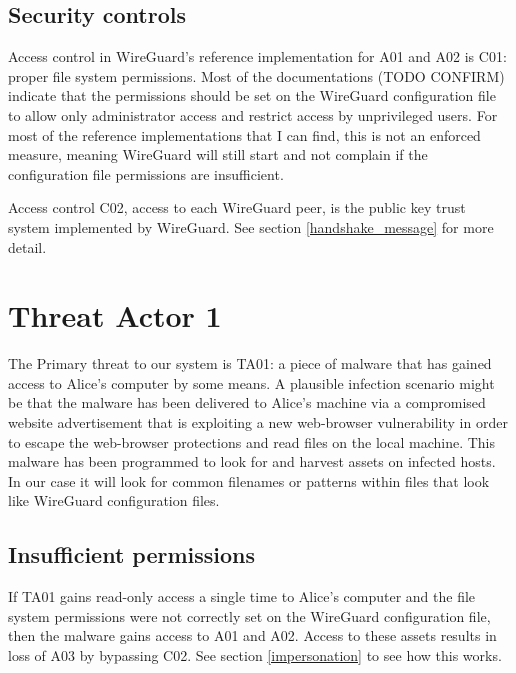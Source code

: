 \documentclass [11pt, proquest] {uwthesis}[2020/02/24]
\begin{document}
\subsection{Security controls}
Access control in WireGuard's reference implementation for A01 and A02 is C01: proper file system permissions. Most of the documentations (TODO CONFIRM) indicate that the permissions should be set on the WireGuard configuration file to allow only administrator access and restrict access by unprivileged users. For most of the reference implementations that I can find, this is not an enforced measure, meaning WireGuard will still start and not complain if the configuration file permissions are insufficient. 

Access control C02, access to each WireGuard peer, is the public key trust system implemented by WireGuard. See section \ref{handshake_message} for more detail.

\section{Threat Actor 1}
The Primary threat to our system is TA01: a piece of malware that has gained access to Alice's computer by some means. A plausible infection scenario might be that the malware has been delivered to Alice's machine via a compromised website advertisement that is exploiting a new web-browser vulnerability in order to escape the web-browser protections and read files on the local machine.  This malware has been programmed to look for and harvest assets on infected hosts. In our case it will look for common filenames or patterns within files that look like WireGuard configuration files.  
\subsection{Insufficient permissions}
If TA01 gains read-only access a single time to Alice's computer and the file system permissions were not correctly set on the WireGuard configuration file, then the malware gains access to A01 and A02. Access to these assets results in loss of A03 by bypassing C02. See section \ref{impersonation} to see how this works.
\end{document}
